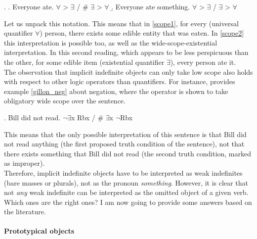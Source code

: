 \ex. \label{scope} \a. \label{scope1} Everyone ate. \hfill $\forall$ > $\exists$ / \# $\exists$ > $\forall$
\b. \label{scope2} Everyone ate something. \hfill $\forall$ > $\exists$ / $\exists$ > $\forall$

Let us unpack this notation. This means that in \ref{scope1}, for every (universal quantifier $\forall$) person, there exists some edible entity that was eaten. In \ref{scope2} this interpretation is possible too, as well as the wide-scope-existential interpretation. In this second reading, which appears to be less perspicuous than the other, for some edible item (existential quantifier $\exists$), every person ate it.\\
The observation that implicit indefinite objects can only take low scope also holds with respect to other logic operators than quantifiers. For instance, \textcite[316]{Gillon2012} provides example \ref{gillon_neg} about negation, where the operator is shown to take obligatory wide scope over the sentence.

\ex. \label{gillon_neg} Bill did not read. \hfill $\neg \exists$x Rbx / \# $\exists$x $\neg$Rbx

This means that the only possible interpretation of this sentence is that Bill did not read anything (the first proposed truth condition of the sentence), not that there exists something that Bill did not read (the second truth condition, marked as improper).\\
Therefore, implicit indefinite objects have to be interpreted as weak indefinites (bare masses or plurals), not as the pronoun \textit{something}. However, it is clear that not \textit{any} weak indefinite can be interpreted as the omitted object of a given verb. Which ones are the right ones? I am now going to provide some answers based on the literature.

\paragraph{Prototypical objects}


